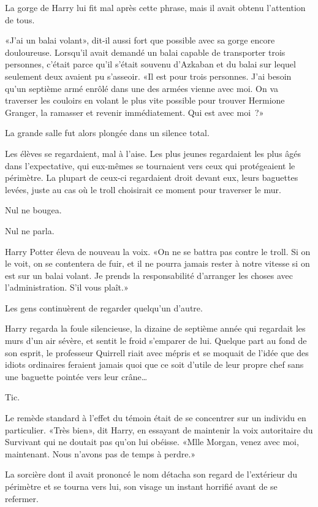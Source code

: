 La gorge de Harry lui fit mal après cette phrase, mais il avait obtenu l'attention de tous.

«J'ai un balai volant», dit-il aussi fort que possible avec sa gorge encore douloureuse. Lorsqu'il avait demandé un balai capable de transporter trois personnes, c'était parce qu'il s'était souvenu d'Azkaban et du balai sur lequel seulement deux avaient pu s'asseoir. «Il est pour trois personnes. J'ai besoin qu'un septième armé enrôlé dans une des armées vienne avec moi. On va traverser les couloirs en volant le plus vite possible pour trouver Hermione Granger, la ramasser et revenir immédiatement. Qui est avec moi~?»

La grande salle fut alors plongée dans un silence total.

Les élèves se regardaient, mal à l'aise. Les plus jeunes regardaient les plus âgés dans l'expectative, qui eux-mêmes se tournaient vers ceux qui protégeaient le périmètre. La plupart de ceux-ci regardaient droit devant eux, leurs baguettes levées, juste au cas où le troll choisirait ce moment pour traverser le mur.

Nul ne bougea.

Nul ne parla.

Harry Potter éleva de nouveau la voix. «On ne se battra pas contre le troll. Si on le voit, on se contentera de fuir, et il ne pourra jamais rester à notre vitesse si on est sur un balai volant. Je prends la responsabilité d'arranger les choses avec l'administration. S'il vous plaît.»

Les gens continuèrent de regarder quelqu'un d'autre.

Harry regarda la foule silencieuse, la dizaine de septième année qui regardait les murs d'un air sévère, et sentit le froid s'emparer de lui. Quelque part au fond de son esprit, le professeur Quirrell riait avec mépris et se moquait de l'idée que des idiots ordinaires feraient jamais quoi que ce soit d'utile de leur propre chef sans une baguette pointée vers leur crâne…

Tic.

Le remède standard à l'effet du témoin était de se concentrer sur un individu en particulier. «Très bien», dit Harry, en essayant de maintenir la voix autoritaire du Survivant qui ne doutait pas qu'on lui obéisse. «Mlle Morgan, venez avec moi, maintenant. Nous n'avons pas de temps à perdre.»

La sorcière dont il avait prononcé le nom détacha son regard de l'extérieur du périmètre et se tourna vers lui, son visage un instant horrifié avant de se refermer.

